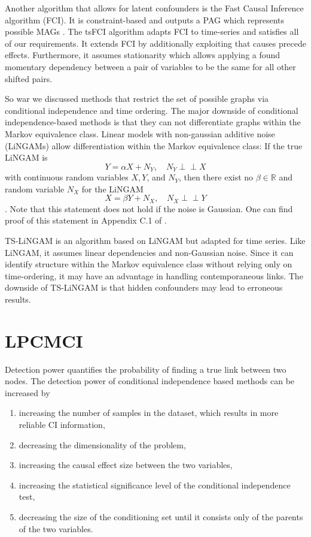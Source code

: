 \documentclass[conference]{IEEEtran}
\begin{document}
Another algorithm that allows for latent confounders is the Fast Causal Inference algorithm (FCI). It is constraint-based and outputs a PAG which represents possible MAGs \cite{spirtes_causation_2000}.
The tsFCI algorithm adapts FCI to time-series and satisfies all of our requirements. It extends FCI by additionally exploiting that causes precede effects. Furthermore, it assumes stationarity which allows applying a found momentary dependency between a pair of variables to be the same for all other shifted pairs.

So war we discussed methods that restrict the set of possible graphs via conditional independence and time ordering. The major downside of conditional independence-based methods is that they can not differentiate graphs within the Markov equivalence class. 
Linear models with non-gaussian additive noise (LiNGAMs) allow differentiation within the Markov equivalence class: 
If the true LiNGAM is 
\begin{equation}
Y=\alpha X+N_{Y}, \quad N_{Y} \!\perp\!\!\!\perp X
\end{equation}
with continuous random variables $X, Y$, and $N_Y$, then there exist no $\beta\in\mathbb{R}$ and random variable $N_X$ for the LiNGAM
\begin{equation}
X=\beta Y+N_{X}, \quad N_{X} \!\perp\!\!\!\perp Y
\end{equation}\cite{peters_elements_2018}.
Note that this statement does not hold if the noise is Gaussian.
One can find proof of this statement in Appendix C.1 of \cite{peters_elements_2018}.

TS-LiNGAM is an algorithm based on LiNGAM but adapted for time series. Like LiNGAM, it assumes linear dependencies and non-Gaussian noise. Since it can identify structure within the Markov equivalence class without relying only on time-ordering, it may have an advantage in handling contemporaneous links\cite{hyvarinen_causal_2008}.
The downside of TS-LiNGAM is that hidden confounders may lead to erroneous results\cite{peters_causal_2013}.

\section{LPCMCI}
Detection power quantifies the probability of finding a true link between two nodes.
The detection power of conditional independence based methods can be increased by
\begin{enumerate}
    \item increasing the number of samples in the dataset, which results in more reliable CI information,
    \item decreasing the dimensionality of the problem\cite{runge_pcmci_2019},
    \item increasing the causal effect size between the two variables,
    \item increasing the statistical significance level of the conditional independence test,
    \item decreasing the size of the conditioning set until it consists only of the parents of the two variables\cite{runge_pcmci_2019}.
\end{enumerate} 
\end{document}
